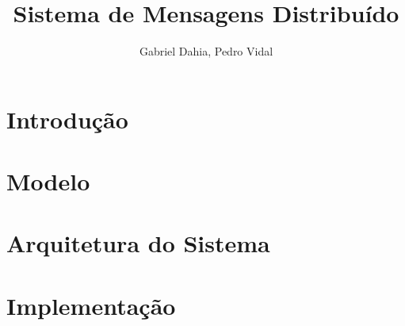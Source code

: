 \documentclass{article}
\title{Sistema de Mensagens Distribuído}
\author{Gabriel Dahia, Pedro Vidal}
\begin{document}
 
\maketitle
 
\section{Introdução} \label{sec:intro}
 


\section{Modelo} \label{sec:model}
 


\section{Arquitetura do Sistema} \label{sec:arc}



\section{Implementação} \label{sec:impl}


 
\end{document}
